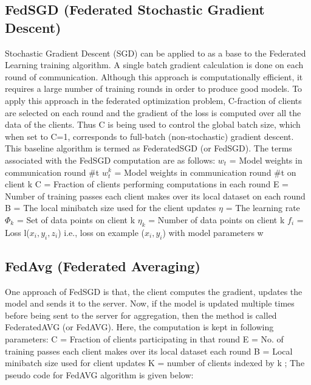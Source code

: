 \subsection{FedSGD (Federated Stochastic Gradient Descent)}
Stochastic Gradient Descent (SGD) can be applied to as a base to the Federated Learning training algorithm. A single batch gradient calculation is done on each round of communication. Although this approach is computationally efficient, it requires a large number of training rounds in order to produce good models. To apply this approach in the federated optimization problem, C-fraction of clients are selected on each round and the gradient of the loss is computed over all the data of the clients. Thus C is being used to control the global batch size, which when set to C=1, corresponds to full-batch (non-stochastic) gradient descent. This baseline algorithm is termed as FederatedSGD (or FedSGD).
\newline
The terms associated with the FedSGD computation are as follows: \newline
$ w_t $ = Model weights in communication round \#t \newline
$ w_t^k $ = Model weights in communication round \#t on client k \newline
C = Fraction of clients performing computations in each round \newline
E = Number of training passes each client makes over its local dataset on each round \newline
B = The local minibatch size used for the client updates \newline
$ \eta $ = The learning rate \newline
$ \Phi_k $ = Set of data points on client k \newline
$ \eta_k $ = Number of data points on client k \newline
$ f_i $ = Loss l($ x_i, y_i, z_i $) i.e., loss on example ($ x_i, y_i$) with model parameters w 

\subsection{FedAvg (Federated Averaging)}
One approach of FedSGD is that, the client computes the gradient, updates the model and sends it to the server. Now, if the model is updated multiple times before being sent to the server for aggregation, then the method is called FederatedAVG (or FedAVG).
Here, the computation is kept in following parameters:\newline
C = Fraction of clients participating in that round\newline
E = No. of training passes each client makes over its local dataset each round\newline 
B = Local minibatch size used for client updates \newline
K = number of clients indexed by k ; \newline
The pseudo code for FedAVG algorithm is given below: 

